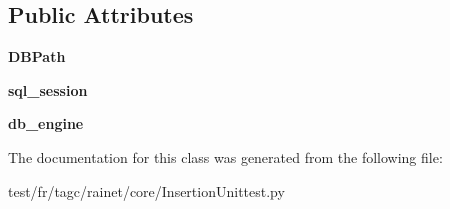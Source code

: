 \subsection*{Public Attributes}
\begin{DoxyCompactItemize}
\item 
\hypertarget{classInsertionUnittest_1_1InsertionUnittest_af17b4ac18e71a7333ab24dec3ff31fe9}{{\bfseries D\-B\-Path}}\label{classInsertionUnittest_1_1InsertionUnittest_af17b4ac18e71a7333ab24dec3ff31fe9}

\item 
\hypertarget{classInsertionUnittest_1_1InsertionUnittest_ac2018da9708216f10f7c002425b47bc3}{{\bfseries sql\-\_\-session}}\label{classInsertionUnittest_1_1InsertionUnittest_ac2018da9708216f10f7c002425b47bc3}

\item 
\hypertarget{classInsertionUnittest_1_1InsertionUnittest_a25a2a9b1cb4c24737ba123dd01f22744}{{\bfseries db\-\_\-engine}}\label{classInsertionUnittest_1_1InsertionUnittest_a25a2a9b1cb4c24737ba123dd01f22744}

\end{DoxyCompactItemize}


The documentation for this class was generated from the following file\-:\begin{DoxyCompactItemize}
\item 
test/fr/tagc/rainet/core/Insertion\-Unittest.\-py\end{DoxyCompactItemize}
